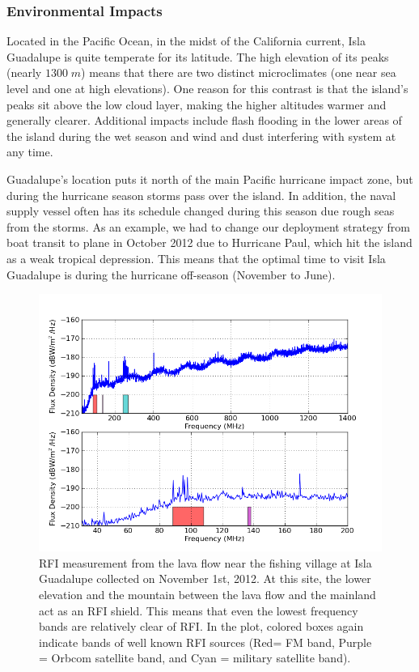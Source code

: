 \subsubsection{Environmental Impacts}

Located in the Pacific Ocean, in the midst of the California current, Isla Guadalupe is quite temperate for its latitude. The high elevation of its peaks (nearly $1300 \; m$) means that there are two distinct microclimates (one near sea level and one at high elevations). One reason for this contrast is that the island's peaks sit above the low cloud layer, making the higher altitudes warmer and generally clearer. Additional impacts include flash flooding in the lower areas of the island during the wet season and wind and dust interfering with system at any time. 

Guadalupe's location puts it north of the main Pacific hurricane impact zone, but during the hurricane season storms pass over the island. In addition, the naval supply vessel often has its schedule changed during this season due rough seas from the storms. As an example, we had to change our deployment strategy from boat transit to plane in October 2012 due to Hurricane Paul, which hit the island as a weak tropical depression. This means that the optimal time to visit Isla Guadalupe is during the hurricane off-season (November to June). 


\begin{figure}[htb]
\begin{center}
\includegraphics[width=0.9\linewidth]{RFI_testing/figures/GI_2__bands.png}
\caption{RFI measurement from the lava flow near the fishing village at Isla Guadalupe collected on November 1st, 2012. At this site, the lower elevation and the mountain between the lava flow and the mainland act as an RFI shield. This means that even the lowest frequency bands are relatively clear of RFI. In the plot, colored boxes again indicate bands of well known RFI sources (Red= FM band, Purple = Orbcom satellite band, and Cyan = military satellite band).}
\label{Fig:guadlow}
\end{center}
\end{figure}

